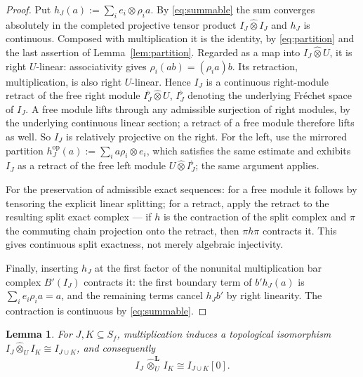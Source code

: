 \documentclass[11pt]{amsart}
\newtheorem{lemma}[theorem]{Lemma}
\theoremstyle{definition}
\theoremstyle{remark}
\begin{document}
\begin{proof}
Put $h_J(a):=\sum_ie_i\otimes\rho_ia$.  By \eqref{eq:summable} the sum
converges absolutely in the completed projective tensor product
$I_J\widehat\otimes I_J$ and $h_J$ is continuous.  Composed with multiplication
it is the identity, by \eqref{eq:partition} and the last assertion of
Lemma~\ref{lem:partition}.  Regarded as a map into
$I_J\widehat\otimes U$, it is right $U$-linear: associativity gives
$\rho_i(ab)=(\rho_ia)b$.  Its retraction, multiplication, is also right
$U$-linear.  Hence $I_J$ is a continuous right-module retract of the free right
module $I_J^{\flat}\widehat\otimes U$, $I_J^{\flat}$ denoting the underlying
Fr\'echet space of $I_J$.  A free module lifts through any admissible surjection
of right modules, by the underlying continuous linear section; a retract of a
free module therefore lifts as well.  So $I_J$ is relatively projective on the
right.  For the left, use the mirrored partition
$h_J^{\mathrm{op}}(a):=\sum_i a\rho_i\otimes e_i$, which satisfies the same
estimate and exhibits $I_J$ as a retract of the free left module
$U\widehat\otimes I_J^{\flat}$; the same argument applies.

For the preservation of admissible exact sequences: for a free module it
follows by tensoring the explicit linear splitting; for a retract, apply the
retract to the resulting split exact complex --- if $h$ is the contraction of
the split complex and $\pi$ the commuting chain projection onto the retract,
then $\pi h\pi$ contracts it.  This gives continuous split exactness, not
merely algebraic injectivity.

Finally, inserting $h_J$ at the first factor of the nonunital multiplication
bar complex $B'(I_J)$ contracts it: the first boundary term of
$b'h_J(a)$ is $\sum_ie_i\rho_ia=a$, and the remaining terms cancel $h_Jb'$ by
right linearity.  The contraction is continuous by \eqref{eq:summable}.
\end{proof}

\begin{lemma}\label{lem:idealproduct}
For $J,K\subseteq S_f$, multiplication induces a topological isomorphism
$I_J\widehat\otimes_UI_K\cong I_{J\cup K}$, and consequently
\begin{equation}\label{eq:idealprod}
I_J\,\widehat\otimes^{\mathbf L}_U\,I_K\cong I_{J\cup K}[0].
\end{equation}
\end{lemma}
\end{document}
